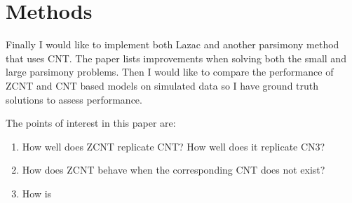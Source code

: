 \section{Methods}
Finally I would like to implement both Lazac and another parsimony method that uses CNT. The paper lists improvements when solving both the small and large parsimony problems. Then I would like to compare the performance of ZCNT and CNT based models on simulated data so I have ground truth solutions to assess performance. 

The points of interest in this paper are: 
\begin{enumerate}
    \item How well does ZCNT replicate CNT? How well does it replicate CN3?
    \item How does ZCNT behave when the corresponding CNT does not exist?
    \item How is 
\end{enumerate}
